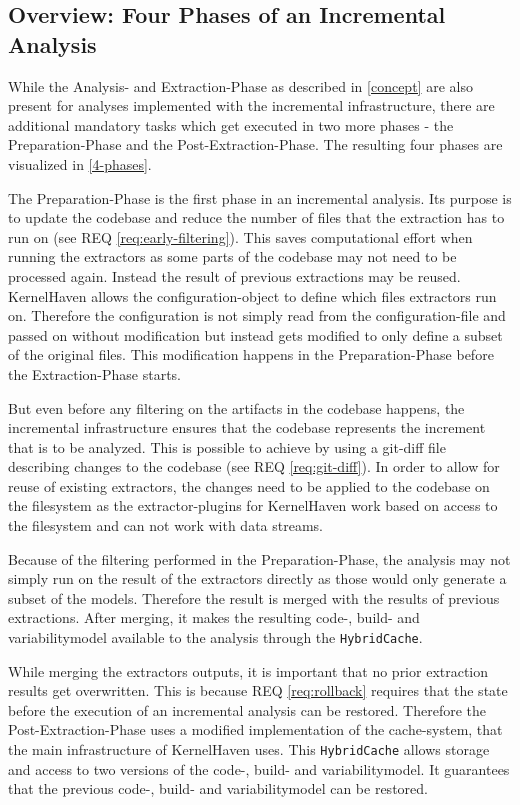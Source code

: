 \documentclass[a4paper]{article}
\begin{document}
\subsection{Overview: Four Phases of an Incremental Analysis}


While the Analysis- and Extraction-Phase as described in \autoref{concept} are also present for analyses implemented with the incremental infrastructure, there are additional mandatory tasks which get executed in two more phases - the Preparation-Phase and the Post-Extraction-Phase. The resulting four phases are visualized in \autoref{4-phases}.

The Preparation-Phase is the first phase in an incremental analysis. Its purpose is to update the codebase and reduce the number of files that the extraction has to run on (see REQ \ref{req:early-filtering}). This saves computational effort when running the extractors as some parts of the codebase  may not need to be processed again. Instead the result of previous extractions may be reused. KernelHaven allows the configuration-object to define which files extractors run on. Therefore the configuration is not simply read from the configuration-file and passed on without modification but instead gets modified to only define a subset of the original files. This modification happens in the Preparation-Phase before the Extraction-Phase starts.

 But even before any filtering on the artifacts in the codebase happens, the incremental infrastructure ensures that the codebase represents the increment that is to be analyzed. This is possible to achieve by using a git-diff file describing changes to the codebase (see REQ \ref{req:git-diff}). In order to allow for reuse of existing extractors, the changes need to be applied to the codebase on the filesystem as the extractor-plugins for KernelHaven work based on access to the filesystem and can not work with data streams.

Because of the filtering performed in the Preparation-Phase, the analysis may not simply run on the result of the extractors directly as those would only generate a subset of the models. Therefore the result is merged with the results of previous extractions. After merging, it makes the resulting code-, build- and variabilitymodel available to the analysis through the \texttt{HybridCache}.

While merging the extractors outputs, it is important that no prior extraction results get overwritten. This is because REQ \ref{req:rollback} requires that the state before the execution of an incremental analysis can be restored. Therefore the Post-Extraction-Phase uses a modified implementation of the cache-system, that the main infrastructure of KernelHaven uses. This \texttt{HybridCache} allows storage and access to two versions of the code-, build- and variabilitymodel. It guarantees that the previous code-, build- and variabilitymodel can be restored.
\end{document}
